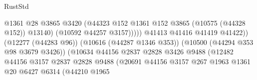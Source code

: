 \begin{lexlean}{RustStd}
\begin{coremodule}
                                                            @1361
                                                            @28
                                                            @3865
                                                            @3420
                                                            (@44323
                                                              @152
                                                              @1361
                                                              @152
                                                              @3865
                                                              (@10575 (@44328 @152))
                                                              @13140)
                                                            (@10592 @44257 @3157)))))
                                                    @41413
                                                    @41416
                                                    @41419
                                                    @41422))
                                                (@12277 (@44283 @96))
                                                (@10616 (@44287 @1346 @353))
                                                (@10500 (@44294 @353 @98 @3679 @3426))
                                                (@10634
                                                  @44156
                                                  @2837
                                                  @2828
                                                  @3426
                                                  @9488
                                                  (@12482
                                                    @44156
                                                    @3157
                                                    @2837
                                                    @2828
                                                    @9488
                                                    (@20691
                                                      @44156
                                                      @3157
                                                      @267
                                                      @1963
                                                      @1361
                                                      @20
                                                      @6427
                                                      @6314
                                                      (@44210
                                                        @1965

\end{coremodule}
\end{lexlean}
